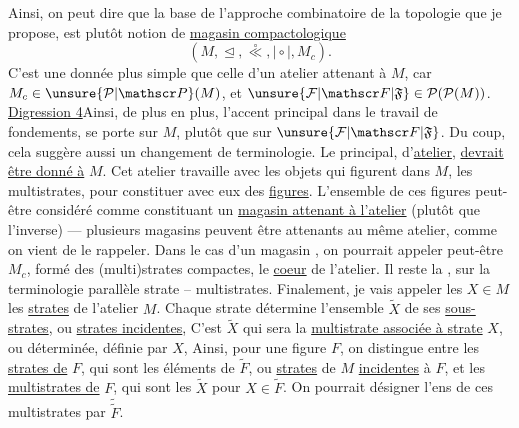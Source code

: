Ainsi, on peut dire que la base  de l'approche combinatoire de la topologie que je propose, est plutôt  notion de \uline{magasin compactologique}
\[
(M,\trianglelefteq,\overset{\circ}{\ll},\mathrel{\mid\circ\mid},M_c).
\]
C'est une donnée plus simple que celle d'un atelier attenant à $M$, car $M_c\in\unsure{\mathcal P|\mathscr P}(M)$, et $\unsure{\mathcal F|\mathscr F|\mathfrak F}\in\mathcal P(\mathcal P(M))$.
\uline{Digression 4}\quad Ainsi, de plus en plus, l'accent principal dans le travail de fondements, se porte sur $M$, plutôt que sur $\unsure{\mathcal F|\mathscr F|\mathfrak F}$. Du coup, cela suggère aussi un changement de terminologie. Le   principal, d'\uline{atelier}, \uline{devrait être donné à} $M$.
Cet atelier travaille avec les objets qui figurent dans $M$, les  multistrates, pour constituer avec eux des \uline{figures}. L'ensemble de ces figures peut-être considéré comme constituant un \uline{magasin attenant à l'atelier} (plutôt que l'inverse) --- plusieurs magasins peuvent être attenants au même atelier, comme on vient de le rappeler.
Dans le cas d'un magasin , on pourrait appeler peut-être $M_c$, formé des (multi)strates compactes, le \uline{coeur} de l'atelier.
Il reste la , sur la terminologie parallèle strate -- multistrates. Finalement, je vais appeler les $X\in M$ les \uline{strates} de l'atelier $M$. Chaque strate détermine l'ensemble $\widetilde X$ de ses \uline{sous-strates}, ou \uline{strates incidentes}, C'est $\widetilde X$ qui sera la \uline{multistrate associée à } \uline{strate} $X$, ou déterminée, définie par $X$, 
Ainsi, pour une figure $F$, on distingue entre les \uline{strates de} $F$, qui sont les éléments de $\widetilde F$, ou \uline{strates} de $M$ \uline{incidentes} à $F$, et les \uline{multistrates de} $F$, qui sont les $\widetilde X$ pour $X\in\widetilde F$. On pourrait désigner l'ens de ces multistrates par $\widetilde{\widetilde F}$.

